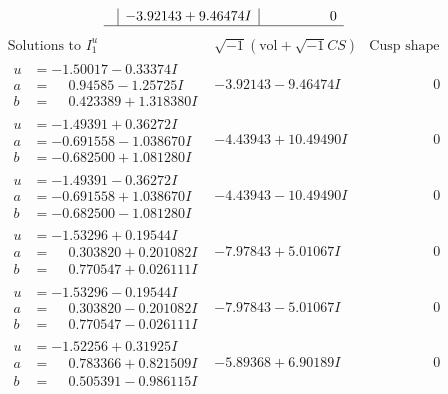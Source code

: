 \documentclass[1p]{elsarticle_modified}
\theoremstyle{definition}
\newcommand{\I}{\sqrt{-1}}
\begin{document}
$$\begin{array}{c|c|c}
 & -3.92143 + 9.46474 I & \phantom{-0.000000 } 0\\
 \hline 
 \end{array}$$\newpage$$\begin{array}{c|c|c}  
\text{Solutions to }I^u_{1}& \I (\text{vol} + \sqrt{-1}CS) & \text{Cusp shape}\\
 \hline 
\begin{aligned}
u &= -1.50017 - 0.33374 I \\
a &= \phantom{-}0.94585 - 1.25725 I \\
b &= \phantom{-}0.423389 + 1.318380 I\end{aligned}
 & -3.92143 - 9.46474 I & \phantom{-0.000000 } 0 \\ \hline\begin{aligned}
u &= -1.49391 + 0.36272 I \\
a &= -0.691558 - 1.038670 I \\
b &= -0.682500 + 1.081280 I\end{aligned}
 & -4.43943 + 10.49490 I & \phantom{-0.000000 } 0 \\ \hline\begin{aligned}
u &= -1.49391 - 0.36272 I \\
a &= -0.691558 + 1.038670 I \\
b &= -0.682500 - 1.081280 I\end{aligned}
 & -4.43943 - 10.49490 I & \phantom{-0.000000 } 0 \\ \hline\begin{aligned}
u &= -1.53296 + 0.19544 I \\
a &= \phantom{-}0.303820 + 0.201082 I \\
b &= \phantom{-}0.770547 + 0.026111 I\end{aligned}
 & -7.97843 + 5.01067 I & \phantom{-0.000000 } 0 \\ \hline\begin{aligned}
u &= -1.53296 - 0.19544 I \\
a &= \phantom{-}0.303820 - 0.201082 I \\
b &= \phantom{-}0.770547 - 0.026111 I\end{aligned}
 & -7.97843 - 5.01067 I & \phantom{-0.000000 } 0 \\ \hline\begin{aligned}
u &= -1.52256 + 0.31925 I \\
a &= \phantom{-}0.783366 + 0.821509 I \\
b &= \phantom{-}0.505391 - 0.986115 I\end{aligned}
 & -5.89368 + 6.90189 I & \phantom{-0.000000 } 0 \\ \hline\begin{aligned}

\end{aligned}
\end{array}$$
\end{document}
